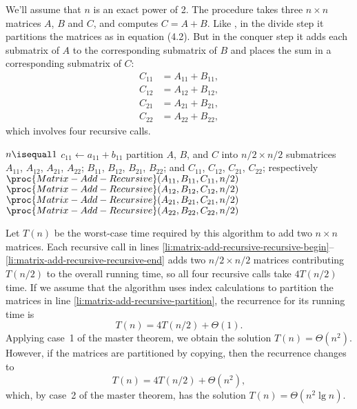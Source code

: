 We'll assume that $n$ is an exact power of 2.
The procedure  takes three $n\times n$ matrices $A$, $B$ and $C$, and computes $C=A+B$.
Like , in the divide step it partitions the matrices as in equation (4.2).
But in the conquer step it adds each submatrix of $A$ to the corresponding submatrix of $B$ and places the sum in a corresponding submatrix of $C$:
\begin{align*}
    C_{11} &= A_{11}+B_{11}, \\
    C_{12} &= A_{12}+B_{12}, \\
    C_{21} &= A_{21}+B_{21}, \\
    C_{22} &= A_{22}+B_{22},
\end{align*}
which involves four recursive calls.

\begin{codebox}
\li \If $n\isequal1$
\li     \Then {}
\li         $c_{11}\gets a_{11}+b_{11}$
\li         \Return
    \End
\li {}
\li partition $A$, $B$, and $C$ into $n/2\times n/2$ submatrices
    \Indentmore
\zi     $A_{11}$, $A_{12}$, $A_{21}$, $A_{22}$; $B_{11}$, $B_{12}$, $B_{21}$, $B_{22}$;
\zi     and $C_{11}$, $C_{12}$, $C_{21}$, $C_{22}$; respectively
    \End \label{li:matrix-add-recursive-partition}
\li {}
\li $\proc{Matrix-Add-Recursive}(A_{11},B_{11},C_{11},n/2)$ \label{li:matrix-add-recursive-recursive-begin}
\li $\proc{Matrix-Add-Recursive}(A_{12},B_{12},C_{12},n/2)$
\li $\proc{Matrix-Add-Recursive}(A_{21},B_{21},C_{21},n/2)$
\li $\proc{Matrix-Add-Recursive}(A_{22},B_{22},C_{22},n/2)$ \label{li:matrix-add-recursive-recursive-end}
\end{codebox}

Let $T(n)$ be the worst-case time required by this algorithm to add two $n\times n$ matrices.
Each recursive call in lines \ref{li:matrix-add-recursive-recursive-begin}--\ref{li:matrix-add-recursive-recursive-end} adds two $n/2\times n/2$ matrices contributing $T(n/2)$ to the overall running time, so all four recursive calls take $4T(n/2)$ time.
If we assume that the algorithm uses index calculations to partition the matrices in line \ref{li:matrix-add-recursive-partition}, the recurrence for its running time is
\[
    T(n) = 4T(n/2)+\Theta(1).
\]
Applying case~1 of the master theorem, we obtain the solution $T(n)=\Theta(n^2)$.
However, if the matrices are partitioned by copying, then the recurrence changes to
\[
    T(n) = 4T(n/2)+\Theta(n^2),
\]
which, by case~2 of the master theorem, has the solution $T(n)=\Theta(n^2\lg n)$.
